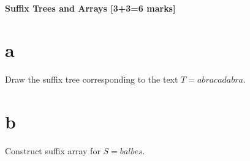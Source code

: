 \documentclass[12pt]{article}
\begin{document}
	\subsection{Suffix Trees and Arrays [3+3=6 marks]}
	\begin{enumerate}
		\part{a} Draw the suffix tree corresponding to the text $T =abracadabra$.
		\part{b} Construct suffix array for $S = balbes$.
	\end{enumerate}
\end{document}
